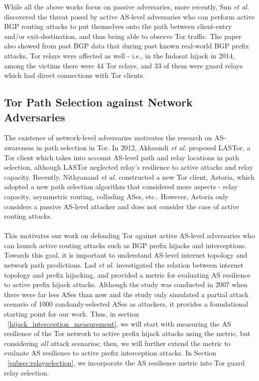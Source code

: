 While all the above works focus on passive adversaries, more recently, Sun \emph{et al.} ~\cite{sun2015raptor} discovered the threat posed by active AS-level adversaries who can perform active BGP routing attacks to put themselves onto the path between client-entry and/or exit-destination, and thus being able to observe Tor traffic. The paper also showed from past BGP data that during past known real-world BGP prefix attacks, Tor relays were affected as well - i.e., in the Indosat hijack in 2014, among the victims there were 44 Tor relays, and 33 of them were guard relays which had direct connections with Tor clients. 

\subsection{Tor Path Selection against Network Adversaries}
The existence of network-level adversaries motivates the research on AS-awareness in path selection in Tor. In 2012, Akhoondi \emph{et al.} \cite{akhoondi2012lastor} proposed LASTor, a Tor client which takes into account AS-level path and relay locations in path selection, although LASTor neglected relay's resilience to active attacks and relay capacity. Recently, Nithyanand \emph{et al.} \cite{starov2015measuring} constructed a new Tor client, Astoria, which adopted a new path selection algorithm that considered more aspects - relay capacity, asymmetric routing, colluding ASes, etc.. However, Astoria only considers a passive AS-level attacker and does not consider the case of active routing attacks.\\
\\
This motivates our work on defending Tor against active AS-level adversaries who can launch active routing attacks such as BGP prefix hijacks and interceptions. Towards this goal, it is important to understand AS-level internet topology and network path predictions. Lad \emph{et al.} \cite{lad2007understanding} investigated the relation between internet topology and prefix hijacking, and provided a metric for evaluating AS resilience to active prefix hijack attacks. Although the study was conducted in 2007 when there were far less ASes than now and the study only simulated a partial attack scenario of 1000 randomly-selected ASes as attackers, it provides a foundational starting point for our work. Thus, in section ~\ref{hijack_interception_measurement}, we will start with measuring the AS resilience of the Tor network to active prefix hijack attacks using the metric, but considering \emph{all} attack scenarios; then, we will further extend the metric to evaluate AS resilience to active prefix interception attacks. In Section ~\ref{subsec:relayselection}, we incorporate the AS resilience metric into Tor guard relay selection. 


